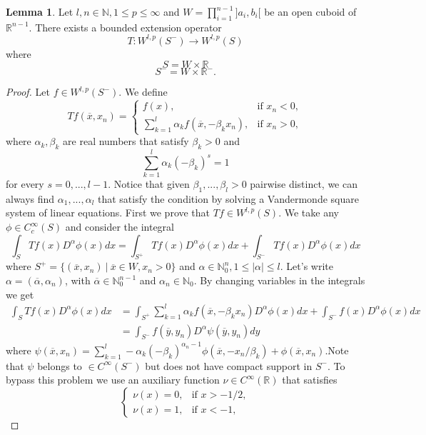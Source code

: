 \documentclass[12pt]{article}
\theoremstyle{definition}
\newtheorem{lemma}{Lemma}
\begin{document}
\begin{lemma}\label{hestenes2}
Let $l,n \in \mathbb{N}, 1\le p \le \infty$ and $W = \prod\limits_{i=1}^{n-1}]a_i,b_i[$ be an open cuboid of $\mathbb{R}^{n-1}$. There exists a bounded extension operator
\[ T: W^{l,p}(S^-) \rightarrow W^{l,p}(S)\]
where 
\[ S=W \times \mathbb{R} \]
\[ S^-=W \times \mathbb{R}^-.\]
\end{lemma}
\begin{proof}
Let $f \in W^{l,p}(S^-)$. We define
\[ Tf(\overline x,x_n) = \begin{cases}
		f(x), & \text {if }x_n<0, \\
		\sum_{k=1}^l \alpha_k f(\overline x,-\beta_k x_n),  &\text {if } x_n>0, 
		\end{cases}
\]
where $\alpha_k,\beta_k$ are real numbers that satisfy $\beta_k>0$ and
\begin{equation}\label{alfabeta}
 \sum_{k=1}^l \alpha_k (-\beta_k)^s=1  
\end{equation}
for every $s=0,...,l-1$.  Notice that given $\beta_1,...,\beta_l>0$  pairwise distinct, we can always find $\alpha_1,...,\alpha_l$ that satisfy the condition by solving a Vandermonde square system of linear equations. First we prove that $Tf \in W^{l,p}(S)$. We take any $\phi \in C^\infty_c(S)$ and consider the integral 
\[ \int_S Tf(x)D^\alpha\phi(x)dx= \int_{S^+} Tf(x)D^\alpha\phi(x)dx+ \int_{S^-} Tf(x)D^\alpha\phi(x)dx\]
where $S^+=\{(\overline x,x_n) \ | \  \overline x \in W, x_n>0 \}$ and $\alpha \in \mathbb{N}^n_0, 1\le|\alpha|\le l$. Let's write $\alpha=(\overline \alpha,\alpha_n)$, with $\overline \alpha \in \mathbb{N}^{n-1}_0$ and $\alpha_n \in  \mathbb{N}_0$.  By changing variables in the integrals we get 
\begin{align*}
 \int_S Tf(x)D^\alpha\phi(x)dx &= \int_{S^+}\sum_{k=1}^l \alpha_k f(\overline x,-\beta_k x_n)  D^\alpha\phi(x)dx+ \int_{S^-} f(x)D^\alpha\phi(x) dx\\
				   &= \int_{S^-} f(\overline y,y_n) D^\alpha \psi(\overline y, y_n) dy \tag{*}
\end{align*}
where $\psi(\overline x,x_n)= \sum_{k=1}^l -\alpha_k (-\beta_k)^{\alpha_n-1}\phi \left( \overline x,-x_n/\beta_k\right)+\phi(\overline x,x_n) $.Note that $\psi$ belongs to $\in C^\infty(S^-)$ but does not have compact support in $S^-$. To bypass this problem we use an auxiliary function $\nu \in C^\infty(\mathbb{R})$ that satisfies 
\[ \begin{cases}
	\nu(x)=0, & \text{if } x>-1/2, \\
	\nu(x)=1, & \text{if }x<-1,

\end{cases}\]
\end{proof}
\end{document}
